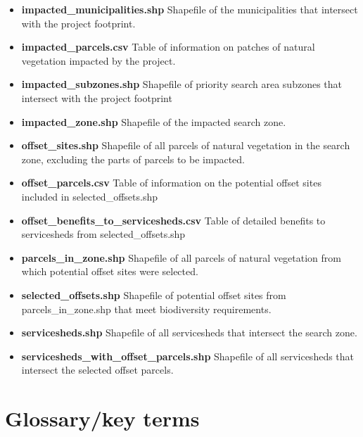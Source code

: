 \documentclass[11pt,letterpaper]{report}
\begin{document}
	\begin{adjustwidth}{0.25in}{}
			
	\begin{itemize}
		\item \textbf{impacted\_{}municipalities.shp} Shapefile of the municipalities that intersect with the project footprint.
		
		\item \textbf{impacted\_{}parcels.csv} Table of information on patches of natural vegetation impacted by the project.
		
		\item \textbf{impacted\_{}subzones.shp} Shapefile of priority search area subzones that intersect with the project footprint
		
		\item \textbf{impacted\_{}zone.shp} Shapefile of the impacted search zone.
		
		\item \textbf{offset\_{}sites.shp} Shapefile of all parcels of natural vegetation in the search zone, excluding the parts of parcels to be impacted.
		
		\item \textbf{offset\_{}parcels.csv} Table of information on the potential offset sites included in selected\_{}offsets.shp
		
		\item \textbf{offset\_{}benefits\_{}to\_{}servicesheds.csv} Table of detailed benefits to servicesheds from selected\_{}offsets.shp
		
		\item \textbf{parcels\_{}in\_{}zone.shp} Shapefile of all parcels of natural vegetation from which potential offset sites were selected.
		
		\item \textbf{selected\_{}offsets.shp}  Shapefile of potential offset sites from parcels\_{}in\_{}zone.shp that meet biodiversity requirements.
		
		\item \textbf{servicesheds.shp} Shapefile of all servicesheds that intersect the search zone.
		
		\item \textbf{servicesheds\_{}with\_{}offset\_{}parcels.shp} Shapefile of all servicesheds that intersect the selected offset parcels.
	\end{itemize}
	\end{adjustwidth}

\chapter{Glossary/key terms}
\label{ch:glossary}
\end{document}
